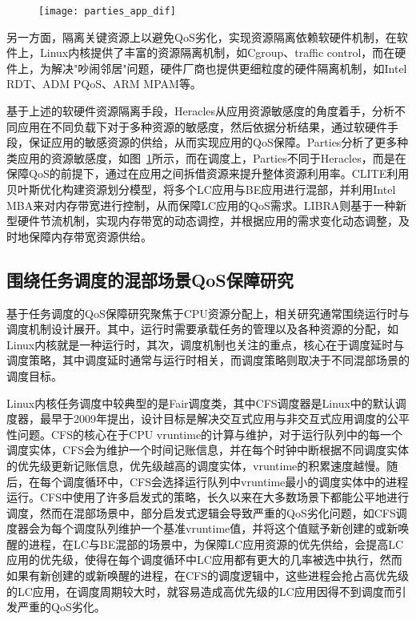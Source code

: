 \begin{figure}[!htbp]
    \centering
    \texttt{[image: parties\_app\_dif]}
    \label{fig:parties_app_dif}
\end{figure}

另一方面，隔离关键资源上以避免QoS劣化，实现资源隔离依赖软硬件机制，在软件上，Linux内核提供了丰富的资源隔离机制，如Cgroup、traffic control，而在硬件上，为解决"吵闹邻居"问题\citep{xu2018dcat, maricq2018taming, rzadca2020autopilot, kwon2020dc}，硬件厂商也提供更细粒度的硬件隔离机制，如Intel RDT、ADM PQoS\citep{amdpqos}、ARM MPAM\citep{armmpam}等。

基于上述的软硬件资源隔离手段，Heracles\citep{lo2015heracles}从应用资源敏感度的角度着手，分析不同应用在不同负载下对于多种资源的敏感度，然后依据分析结果，通过软硬件手段，保证应用的敏感资源的供给，从而实现应用的QoS保障。Parties\citep{chen2019parties}分析了更多种类应用的资源敏感度，如图~\ref{fig:parties_app_dif}所示，而在调度上，Parties不同于Heracles，而是在保障QoS的前提下，通过在应用之间拆借资源来提升整体资源利用率。CLITE\citep{patel2020clite}利用贝叶斯优化构建资源划分模型，将多个LC应用与BE应用进行混部，并利用Intel MBA来对内存带宽进行控制，从而保障LC应用的QoS需求。LIBRA\citep{zhang2021libra}则基于一种新型硬件节流机制，实现内存带宽的动态调控，并根据应用的需求变化动态调整，及时地保障内存带宽资源供给。

\subsection{围绕任务调度的混部场景QoS保障研究}


基于任务调度的QoS保障研究聚焦于CPU资源分配上，相关研究通常围绕运行时与调度机制设计展开。其中，运行时需要承载任务的管理以及各种资源的分配，如Linux内核就是一种运行时，其次，调度机制也关注的重点，核心在于调度延时与调度策略，其中调度延时通常与运行时相关，而调度策略则取决于不同混部场景的调度目标。

Linux内核任务调度中较典型的是Fair调度类，其中CFS调度器\citep{pabla2009completely}是Linux中的默认调度器，最早于2009年提出，设计目标是解决交互式应用与非交互式应用调度的公平性问题。CFS的核心在于CPU vruntime的计算与维护，对于运行队列中的每一个调度实体，CFS会为维护一个时间记账信息，并在每个时钟中断根据不同调度实体的优先级更新记账信息，优先级越高的调度实体，vruntime的积累速度越慢。随后，在每个调度循环中，CFS会选择运行队列中vruntime最小的调度实体中的进程运行。CFS中使用了许多启发式的策略，长久以来在大多数场景下都能公平地进行调度，然而在混部场景中，部分启发式逻辑会导致严重的QoS劣化问题，如CFS调度器会为每个调度队列维护一个基准vruntime值，并将这个值赋予新创建的或新唤醒的进程，在LC与BE混部的场景中，为保障LC应用资源的优先供给，会提高LC应用的优先级，使得在每个调度循环中LC应用都有更大的几率被选中执行，然而如果有新创建的或新唤醒的进程，在CFS的调度逻辑中，这些进程会抢占高优先级的LC应用，在调度周期较大时，就容易造成高优先级的LC应用因得不到调度而引发严重的QoS劣化。

